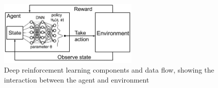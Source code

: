 \begin{figure}[H]
  \centering
  \includegraphics[width=0.6\textwidth]{figures/images/deep_rl.png}
  \caption[Deep reinforcement learning flow]{Deep reinforcement learning components and data flow, showing the interaction between the agent and environment \cite{jakhar2020reinforcement}}
  \label{fig:deep_rl}
\end{figure}
